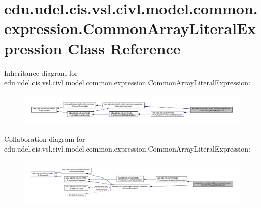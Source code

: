 \hypertarget{classedu_1_1udel_1_1cis_1_1vsl_1_1civl_1_1model_1_1common_1_1expression_1_1CommonArrayLiteralExpression}{}\section{edu.\+udel.\+cis.\+vsl.\+civl.\+model.\+common.\+expression.\+Common\+Array\+Literal\+Expression Class Reference}
\label{classedu_1_1udel_1_1cis_1_1vsl_1_1civl_1_1model_1_1common_1_1expression_1_1CommonArrayLiteralExpression}


Inheritance diagram for edu.\+udel.\+cis.\+vsl.\+civl.\+model.\+common.\+expression.\+Common\+Array\+Literal\+Expression\+:
\nopagebreak
\begin{figure}[H]
\begin{center}
\leavevmode
\includegraphics[width=350pt]{classedu_1_1udel_1_1cis_1_1vsl_1_1civl_1_1model_1_1common_1_1expression_1_1CommonArrayLiteralExpression__inherit__graph}
\end{center}
\end{figure}


Collaboration diagram for edu.\+udel.\+cis.\+vsl.\+civl.\+model.\+common.\+expression.\+Common\+Array\+Literal\+Expression\+:
\nopagebreak
\begin{figure}[H]
\begin{center}
\leavevmode
\includegraphics[width=350pt]{classedu_1_1udel_1_1cis_1_1vsl_1_1civl_1_1model_1_1common_1_1expression_1_1CommonArrayLiteralExpression__coll__graph}
\end{center}
\end{figure}
